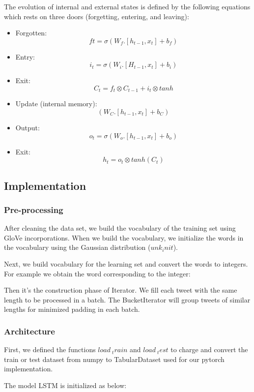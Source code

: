 \documentclass{article}
\begin{document}
The evolution of internal and external states is defined by the following equations which rests on three doors (forgetting, entering, and leaving):
\begin{itemize}
    \item Forgotten:
    $$ft = \sigma (W_f .[h_{t - 1}, x_t] + b_f)$$
    \item Entry:
    $$i_t = \sigma (W_i . [H_{t - 1}, x_t] + b_i)$$
    \item Exit:
    $$C_t = f_t \otimes C_{t - 1} + i_t \otimes tanh$$
    \item Update (internal memory):
    $$(W_C . [h_{t - 1}, x_t] + b_C)$$
    \item Output:
    $$o_t = \sigma (W_o . [h_{t - 1}, x_t] + b_o)$$
    \item Exit:
    $$h_t = o_t \otimes tanh (C_t)$$
\end{itemize}

\subsection{Implementation}

\subsubsection{Pre-processing}

After cleaning the data set, we build the vocabulary of the training set using GloVe incorporations. When we build the vocabulary, we initialize the words in the vocabulary using the Gaussian distribution ($unk_init$).

Next, we build vocabulary for the learning set and convert the words to integers. For example we obtain the word corresponding to the integer:

Then it's the construction phase of Iterator. We fill each tweet with the same length to be processed in a batch. The BucketIterator will group tweets of similar lengths for minimized padding in each batch.

\subsubsection{Architecture}

First, we defined the functions $ load \ _train $ and $ load \ _test $ to charge and convert the train or test dataset from numpy to TabularDataset used for our pytorch implementation.

The model LSTM is initialized as below:
\end{document}
